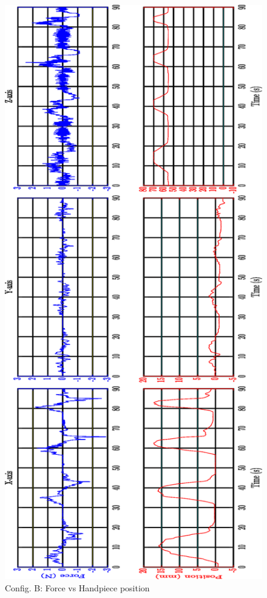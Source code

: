 \begin{figure}[htbp]
\begin{center}
\includegraphics[width=0.7\linewidth]{Images/exp/ConfigB_3.eps}
\caption{Config. B: Force vs Handpiece position}
\label{fig: exp1_2_3}
\end{center}
\end{figure}

